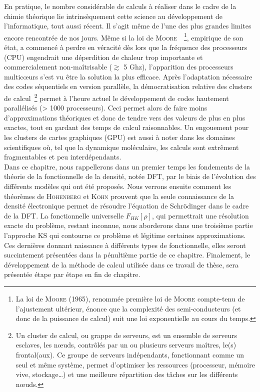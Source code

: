 En pratique, le nombre considérable de calculs à réaliser dans le cadre de la chimie théorique lie intrinsèquement cette science au développement de l'informatique, tout aussi récent. Il s'agit même de l'une des plus grandes limites encore rencontrée de nos jours. Même si la loi de \textsc{Moore}~\cite{moore}~\footnote{La loi de \textsc{Moore} (1965), renommée première loi de \textsc{Moore} compte-tenu de l'ajustement ultérieur, énonce que la complexité des semi-conducteurs (et donc de la puissance de calcul) suit une loi exponentielle au cours du temps.}, empirique de son état, a commencé à perdre en véracité dès lors que la fréquence des processeurs (CPU) engendrait une déperdition de chaleur trop importante et commercialement non-maîtrisable ($\gtrsim$ 5 Ghz), l'apparition des processeurs multic\oe urs s'est vu être la solution la plus efficace. Après l'adaptation nécessaire des codes séquentiels en version parallèle, la démocratisation relative des clusters de calcul~\footnote{Un cluster de calcul, ou grappe de serveurs, est un ensemble de serveurs esclaves, les n\oe uds, contrôlés par un ou plusieurs serveurs maîtres, le(s) frontal(aux). Ce groupe de serveurs indépendants, fonctionnant comme un seul et même système, permet d'optimiser les ressources (processeur, mémoire vive, stockage\dots{}) et une meilleure répartition des tâches sur les différents n\oe uds.} permet à l'heure actuel le développement de codes hautement parallélisés (> 1000 processeurs). Ceci permet alors de faire moins d'approximations théoriques et donc de tendre vers des valeurs de plus en plus exactes, tout en gardant des temps de calcul raisonnables. Un engouement pour les clusters de cartes graphiques (GPU) est aussi à noter dans les domaines scientifiques où, tel que la dynamique moléculaire, les calculs sont extrêment fragmentables et peu interdépendants.\\

Dans ce chapitre, nous rappellerons dans un premier temps les fondements de la théorie de la fonctionnelle de la densité, notée DFT, par le biais de l'évolution des différents modèles qui ont été proposés. Nous verrons ensuite comment les théorèmes de \textsc{Hohenberg} et \textsc{Kohn} prouvent que la seule connaissance de la densité électronique permet de résoudre l'équation de Schr\"{o}dinger dans le cadre de la DFT. La fonctionnelle universelle $F_{HK}[\rho]$, qui permettrait une résolution exacte du problème, restant inconnue, nous aborderons dans une troisième partie l'approche KS qui contourne ce problème et légitime certaines approximations. Ces dernières donnant naissance à différents types de fonctionnelle, elles seront succintement présentées dans la pénultième partie de ce chapitre. Finalement, le développement de la méthode de calcul utilisée dans ce travail de thèse, sera présentée étape par étape en fin de chapitre. 


